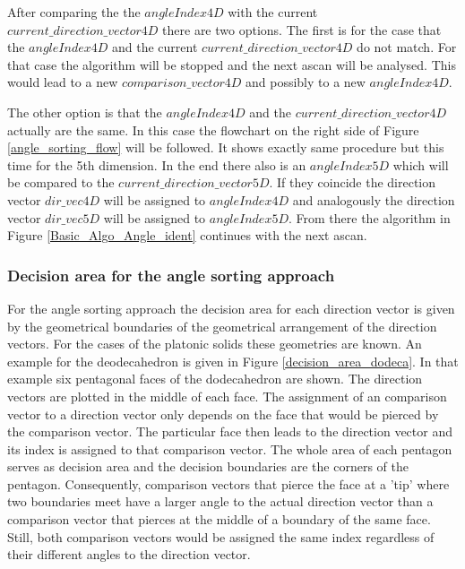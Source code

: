 After comparing the the $angleIndex4D$ with the current $current\_direction\_vector4D$ there are two options. The first is for the case that the $angleIndex4D$ and the current $current\_direction\_vector4D$ do not match. For that case the algorithm will be stopped and the next \ac{ascan} will be analysed. This would lead to a new $comparison\_vector4D$ and possibly to a new $angleIndex4D$. 

The other option is that the $angleIndex4D$ and the $current\_direction\_vector4D$ actually are the same. In this case the flowchart on the right side of Figure \ref{angle_sorting_flow} will be followed. It shows exactly same procedure but this time for the 5th dimension. In the end there also is an $angleIndex5D$ which will be compared to the $current\_direction\_vector5D$. If they coincide the direction vector $dir\_vec4D$ will be assigned to $angleIndex4D$ and analogously the direction vector $dir\_vec5D$ will be assigned to $angleIndex5D$. From there the algorithm in Figure \ref{Basic_Algo_Angle_ident} continues with the next \ac{ascan}. 
















\subsubsection{Decision area for the angle sorting approach}

For the angle sorting approach the decision area for each direction vector is given by the geometrical boundaries of the geometrical arrangement of the direction vectors. For the cases of the platonic solids these geometries are known. An example for the deodecahedron is given in Figure \ref{decision_area_dodeca}. In that example six pentagonal faces of the dodecahedron are shown. The direction vectors are plotted in the middle of each face. The assignment of an comparison vector to a direction vector only depends on the face that would be pierced by the comparison vector. The particular face then leads to the direction vector and its index is assigned to that comparison vector. The whole area of each pentagon serves as decision area and the decision boundaries are the corners of the pentagon. Consequently, comparison vectors that pierce the face at a 'tip' where two boundaries meet have a larger angle to the actual direction vector than a comparison vector that pierces at the middle of a boundary of the same face. Still, both comparison vectors would be assigned the same index regardless of their different angles to the direction vector.



